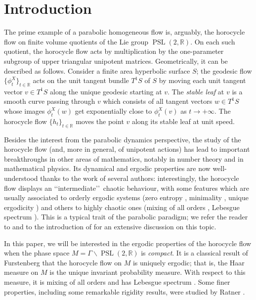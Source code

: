 \documentclass[JEP,XML,SOM,NoEqCountersInSection,Unicode,published]{cedram}
\newcommand \R{\mathbb{R}}
\DeclareMathOperator{\PSL}{PSL}
\theoremstyle{definition}
\begin{document}
\maketitle
{\let\footnotemark\relax\tableofcontents}
\mainmatter

\section{Introduction}\label{sec:introduction}

The prime example of a parabolic homogeneous flow is, arguably, the horocycle flow on finite volume quotients of the Lie group $\PSL(2,\R)$.
On each such quotient, the horocycle flow acts by multiplication by the one-parameter subgroup of upper triangular unipotent matrices.
Geometrically, it can be described as follows. Consider a finite area hyperbolic surface $S$; the geodesic flow $\{ \phi^X_t\}_{t \in \R}$ acts on the unit tangent bundle $T^1S$ of $S$ by moving each unit tangent vector $v \in T^1S$ along the unique geodesic starting at $v$. The \emph{stable leaf} at $v$ is a smooth curve passing through $v$ which consists of all tangent vectors $w \in T^1S$ whose images $\phi^X_t(w)$ get exponentially close to $\phi^X_t(v)$ as $t \to +\infty$. The horocycle flow $\{h_t\}_{t \in \R}$ moves the point $v$ along its stable leaf at unit speed.\enlargethispage{\baselineskip}

Besides the interest from the parabolic dynamics perspective, the study of the horocycle flow (and, more in general, of unipotent actions) has lead to important breakthroughs in other areas of mathematics, notably in number theory and in mathematical physics.
Its dynamical and ergodic properties are now well-understood thanks to the work of several authors: interestingly, the horocycle flow displays an \lq\lq intermediate\rq\rq\ chaotic behaviour, with some features which are usually associated to orderly ergodic systems (zero entropy \cite{Gur}, minimality \cite{Hed}, unique ergodicity \cite{Fur}) and others to highly chaotic ones (mixing of all orders \cite{Mar}, Lebesgue spectrum \cite{Par}). This is a typical trait of the parabolic paradigm; we refer the reader to \cite[Chap.\,8]{HasKat} and to the introduction of \cite{AFRU} for an extensive discussion on this topic.

In this paper, we will be interested in the ergodic properties of the horocycle flow when the phase space $M = \Gamma \backslash \PSL(2,\R)$ is \emph{compact}.
It is a classical result of Furstenberg \cite{Fur} that the horocycle flow on $M$ is uniquely ergodic; that is, the Haar measure on $M$ is the unique invariant probability measure.
With respect to this measure, it is mixing of all orders \cite{Mar} and has Lebesgue spectrum \cite{GeFo, Par}.
Some finer properties, including some remarkable rigidity results, were studied by Ratner \cite{Rat2, Rat4, Rat3}.
\end{document}
